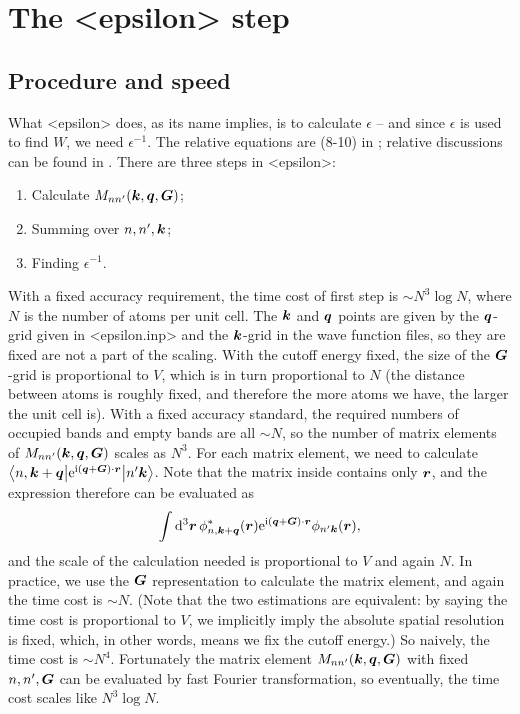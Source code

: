 \documentclass[hyperref, a4paper, 12pt]{report}
\newcommand*{\ii}{\mathrm{i}}
\newcommand*{\ee}{\mathrm{e}}
\def\texttt#1{<#1>}%
\newcommand{\shortcode}[1]{\texttt{#1}}
\begin{document}
\section{The \shortcode{epsilon} step}

\subsection{Procedure and speed}\label{sec:epsilon.procedure-speed}

What \shortcode{epsilon} does, 
as its name implies, is to calculate $\epsilon$ --
and since $\epsilon$ is used to find $W$,
we need $\epsilon^{-1}$.
The relative equations are (8-10) in \cite{berkeleygw};
relative discussions can be found in .
There are three steps in \shortcode{epsilon}:
\begin{enumerate}
    \item Calculate $M_{nn'}(\vb*{k}, \vb*{q}, \vb*{G})$;
    \item Summing over $n, n', \vb*{k}$;
    \item Finding $\epsilon^{-1}$.
\end{enumerate}

With a fixed accuracy requirement,
the time cost of first step is $\sim N^3 \log N$,
where $N$ is the number of atoms per unit cell.
The $\vb*{k}$ and $\vb*{q}$ points are given 
by the $\vb*{q}$-grid given in \shortcode{epsilon.inp}
and the $\vb*{k}$-grid in the wave function files,
so they are fixed are not a part of the scaling.
With the cutoff energy fixed,
the size of the $\vb*{G}$-grid is proportional to $V$,
which is in turn proportional to $N$
(the distance between atoms is roughly fixed,
and therefore the more atoms we have,
the larger the unit cell is).
With a fixed accuracy standard,
the required numbers of occupied bands and empty bands 
are all $\sim N$,
so the number of matrix elements of $M_{nn'}(\vb*{k}, \vb*{q}, \vb*{G})$ scales as $N^3$.
For each matrix element, 
we need to calculate 
$\mel**{n, \vb*{k} + \vb*{q}}{\ee^{\ii (\vb*{q} + \vb*{G}) \cdot \vb*{r} }}{n' \vb*{k}}$.
Note that the matrix inside contains only $\vb*{r}$,
and the expression therefore can be evaluated as 
\[
    \int \dd[3]{\vb*{r}} \phi_{n, \vb*{k} + \vb*{q}}^*(\vb*{r}) 
    \ee^{\ii (\vb*{q} + \vb*{G}) \cdot \vb*{r}}
    \phi_{n' \vb*{k}}(\vb*{r}),
\]
and the scale of the calculation needed is proportional to $V$
and again $N$.
In practice, we use the $\vb*{G}$ representation to calculate the matrix element,
and again the time cost is $\sim N$.
(Note that the two estimations are equivalent: 
by saying the time cost is proportional to $V$,
we implicitly imply the absolute spatial resolution is fixed,
which, in other words, means we fix the cutoff energy.)
So naively, the time cost is $\sim N^4$.
Fortunately the matrix element $M_{nn'}(\vb*{k}, \vb*{q}, \vb*{G})$
with fixed $n, n', \vb*{G}$ 
can be evaluated by fast Fourier transformation,
so eventually, the time cost scales like $N^3 \log N$.
\end{document}
